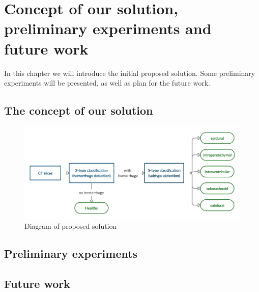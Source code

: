 \chapter{Concept of our solution, preliminary experiments and future work} %
In this chapter we will introduce the initial proposed solution. Some preliminary experiments will be presented, as well as plan for the future work.
\section{The concept of our solution}

\begin{figure}[!ht]
\begin{centering}
\includegraphics[width=16cm]{assets/images/mySolution.png}
\par\end{centering}
\caption{Diagram of proposed solution \label{fig:solution}}
\end{figure}

\section{Preliminary experiments}
\section{Future work}
